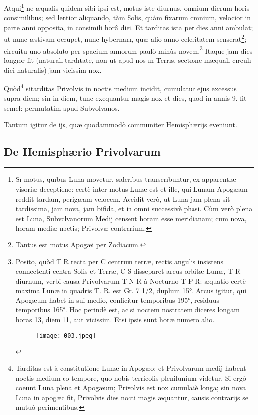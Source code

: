 \documentclass[a4paper, 11pt, oneside, polutonikogreek, german]{article}
\begin{document}
Atqui\footnote{Si motus, quibus Luna movetur, sideribus transcribuntur, ex apparentiæ visoriæ deceptione: certè inter motus Lunæ est et ille, qui Lunam Apogæam reddit tardam, perigæam velocem. Accidit verò, ut Luna jam plena sit tardissima, jam nova, jam bifida, et in omni successivè phasi. Cùm verò plena est Luna, Subvolvanorum Medij censent horam esse meridianam; cum nova, horam mediæ noctis; Privolvæ contrarium.} ne æqualis quidem sibi ipsi est, motus iste diurnus, omnium dierum horis consimilibus; sed lentior aliquando, tàm Solis, quàm fixarum omnium, velocior in parte anni opposita, in consimili horâ diei. Et tarditas ista per dies anni ambulat; ut nunc æstivam occupet, nunc hybernam, quæ alio anno celeritatem senserat\footnote{Tantus est motus Apogæi per Zodiacum.}; circuitu uno absoluto per spacium annorum paulò minùs novem.\footnote{Posito, quòd T R recta per C centrum terræ, rectis angulis insistens connectenti centra Solis et Terræ, C S disseparet arcus orbitæ Lunæ, T R diurnum, verbi causa Privolvarum T N R à Nocturno T P R: æquatio certè maxima Lunæ in quadris T. R. est Gr. 7 1/2, duplum 15°. Arcus igitur, qui Apogæum habet in sui medio, conficitur temporibus 195°, residuus temporibus 165°. Hoc perindè est, ac si noctem nostratem diceres longam horas 13, diem 11, aut vicissim. Etsi ipsis sunt horæ numero alio.\begin{figure}[H]
\centering
\texttt{[image: 003.jpeg]}
\end{figure}} Itaque jam dies longior fit (naturali tarditate, non ut apud nos in Terris, sectione inæquali circuli diei naturalis) jam vicissim nox.

Quòd\footnote{Tarditas est à constitutione Lunæ in Apogæo; et Privolvarum medij habent noctis medium eo tempore, quo nobis terricolis plenilunium videtur. Si ergò coeunt Luna plena et Apogæum; Privolvis est nox cumulatè longa; sin nova Luna in apogæo fit, Privolvis dies nocti magis æquantur, causis contrarijs se mutuò perimentibus.} sitarditas Privolvis in noctis medium incidit, cumulatur ejus excessus supra diem; sin in diem, tunc exequantur magis nox et dies, quod in annis 9. fit semel: permutatim apud Subvolvanos.

Tantum igitur de ijs, quæ quodammodò communiter Hemisphærijs eveniunt.

\subsection{De Hemisphærio Privolvarum}
\end{document}
